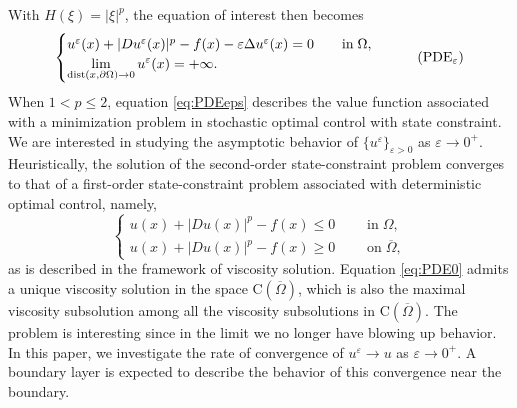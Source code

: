 \documentclass[11pt,reqno]{amsart}
\numberwithin{figure}{section}
\theoremstyle{plain}
\theoremstyle{remark}
\numberwithin{equation}{section}
\newcommand{\R}{\mathbb{R}}
\newcommand{\rmC}{\mathrm{C}}
\begin{document}
 \noindent 
 With $H(\xi) = |\xi|^p$, the equation of interest then becomes
\begin{equation}\label{eq:PDEeps}
    \begin{cases}
      u^\varepsilon(x) + |Du^\varepsilon(x)|^p - f(x) - \varepsilon \Delta u^\varepsilon(x) = 0 \qquad
    \text{in}\;\Omega, \vspace{0cm}\\
    \displaystyle  \lim_{\mathrm{dist}(x,\partial \Omega)\to 0} u^\varepsilon(x) = +\infty.
    \end{cases} \tag{PDE$_\varepsilon$}
\end{equation}
When $1<p\leq 2$, equation \eqref{eq:PDEeps} describes the value function associated with a minimization problem in stochastic optimal control with state constraint. We are interested in studying the asymptotic behavior of $\{u^\varepsilon\}_{\varepsilon>0}$ as $\varepsilon\rightarrow 0^+$. Heuristically, the solution of the second-order state-constraint problem converges to that of a first-order state-constraint problem associated with deterministic optimal control, namely,
\begin{equation}\label{eq:PDE0}
    \begin{cases}
       u(x) + |Du(x)|^p - f(x) \leq 0\;\qquad\text{in}\;\Omega,\\
       u(x) + |Du(x)|^p - f(x) \geq 0\;\qquad\text{on}\;\overline{\Omega},
    \end{cases} \tag{PDE$_0$}
\end{equation}
as is described in the framework of viscosity solution.
Equation \eqref{eq:PDE0} admits a unique viscosity solution in the space $\rmC(\overline{\Omega})$, which is also the maximal viscosity subsolution among all the viscosity subsolutions in $\rmC(\overline{\Omega})$. The problem is interesting since in the limit we no longer have blowing up behavior. In this paper, we investigate the rate of convergence of $u^\varepsilon \to u$ as $\varepsilon\to 0^+$. A boundary layer is expected to describe the behavior of this convergence near the boundary.
\end{document}
